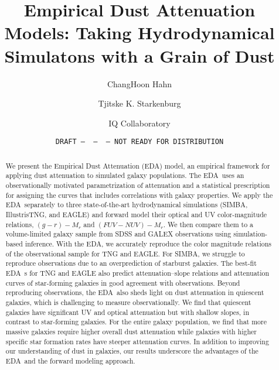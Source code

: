 \documentclass[12pt, letterpaper, preprint, comicneue]{aastex63}
\newcommand{\gr}{g{-}r}
\newcommand{\fnuv}{FUV{-}NUV}
\newcommand{\eda}{EDA}
\begin{document}
 \sloppy\sloppypar\frenchspacing 

\title{Empirical Dust Attenuation Models: Taking Hydrodynamical Simulatons with a Grain of Dust}
\date{\texttt{DRAFT~---~\githash~---~\gitdate~---~NOT READY FOR DISTRIBUTION}}

\author{ChangHoon Hahn}

\author{Tjitske K. Starkenburg}

\author{IQ Collaboratory}

\begin{abstract}
    We present the Empirical Dust Attenuation (\eda) model, an empirical
    framework for applying dust attenuation to simulated galaxy populations.
    The \eda~uses an observationally motivated parametrization of attenuation
    and a statistical prescription for assigning the curves that 
    includes correlations with galaxy properties. We apply the \eda~separately
    to three state-of-the-art hydrodynamical simulations (SIMBA,
    IllustrisTNG, and EAGLE) and forward model their optical and UV
    color-magnitude relations, $(\gr) - M_r$ and $(\fnuv)-M_r$. We then compare
    them to a volume-limited galaxy sample from SDSS and GALEX observations
    using simulation-based inference. With the \eda, we accurately reproduce
    the color magnitude relations of the observational sample for TNG and
    EAGLE. For SIMBA, we struggle to reproduce observations due to an overprediction 
    of starburst galaxies. The best-fit \eda~s for TNG and EAGLE also predict
    attenuation--slope relations and attenuation curves of star-forming
    galaxies in good agreement with observations. Beyond reproducing observations,
    the \eda~also sheds light on dust attenuation in quiescent galaxies, which
    is challenging to measure observationally. We find that quiescent galaxies 
    have significant UV and optical attenuation but with shallow slopes, in
    contrast to star-forming galaxies. For the entire galaxy population, we
    find that more massive galaxies require higher overall dust attenuation
    while galaxies with higher specific star formation rates have steeper 
    attenuation curves. In addition to improving our understanding of dust in 
    galaxies, our results underscore the advantages of the \eda~and the forward 
    modeling approach. 
\end{abstract}
\end{document}

